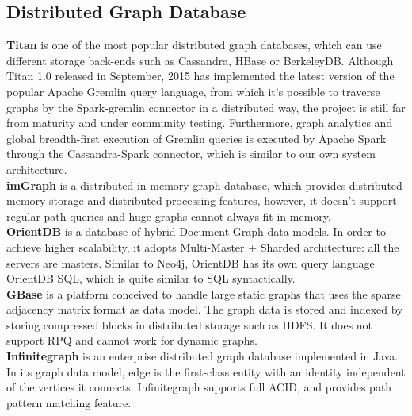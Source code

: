\subsection{Distributed Graph Database}

\textbf{Titan}\cite{titan} is one of the most popular distributed graph databases, which can use different storage back-ends such as Cassandra, HBase or BerkeleyDB. Although Titan 1.0 released in September, 2015 has implemented the latest version of the popular Apache Gremlin query language, from which it's possible to traverse graphs by the Spark-gremlin connector in a distributed way, the project is still far from maturity and under community testing. Furthermore, graph analytics and global breadth-first execution of Gremlin queries is executed by Apache Spark through the Cassandra-Spark connector, which is similar to our own system architecture.\\


\noindent\textbf{imGraph}\cite{imgraph} is a distributed in-memory graph database, which provides distributed memory storage and distributed processing features, however, it doesn't support regular path queries and huge graphs cannot always fit in memory.\\

\noindent\textbf{OrientDB}\cite{orientdb} is a database of hybrid Document-Graph data models. In order to achieve higher scalability, it adopts Multi-Master + Sharded architecture: all the servers are masters. Similar to Neo4j, OrientDB has its own query language OrientDB SQL, which is quite similar to SQL syntactically.\\

\noindent\textbf{GBase}\cite{GBase} is a platform conceived to handle large static graphs that uses the sparse adjacency matrix format as data model. The graph data is stored and indexed by storing compressed blocks in distributed storage such as HDFS. It does not support RPQ and cannot work for dynamic graphs.\\

\noindent\textbf{Infinitegraph}\cite{infinitegraph} is an enterprise distributed graph database implemented in Java. In its graph data model, edge is the first-class entity with an identity independent of the vertices it connects. Infinitegraph supports full ACID, and provides path pattern matching feature.\\


